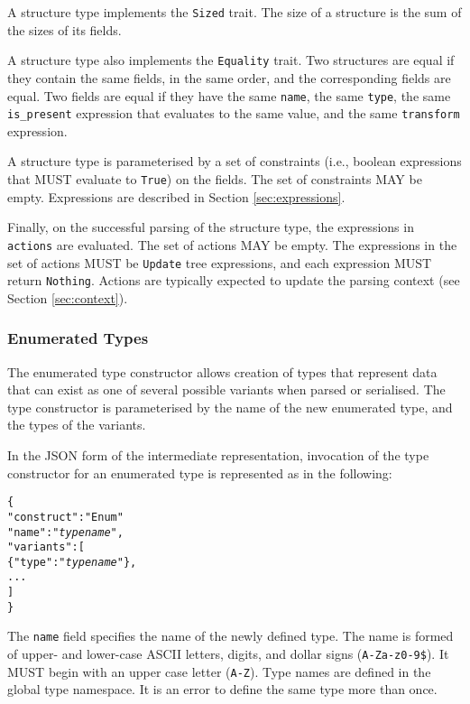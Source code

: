 \documentclass[10pt,twocolumn,a4paper]{article}
\newcommand{\code}[1]{\texttt{#1}}
\begin{document}
A structure type implements the \code{Sized} trait. The size of a structure is the
sum of the sizes of its fields.

A structure type also implements the \code{Equality} trait. Two structures
are equal if they contain the same fields, in the same order, and the
corresponding fields are equal. Two fields are equal if they have the same
\code{name}, the same \code{type}, the same \code{is\_present} expression
that evaluates to the same value, and the same \code{transform} expression.

A structure type is parameterised by a set of constraints (i.e., boolean
expressions that MUST evaluate to \code{True}) on the
fields. The set of constraints MAY be empty. Expressions are described in
Section \ref{sec:expressions}.

Finally, on the successful parsing of the structure type, the expressions
in \code{actions} are evaluated. The set of actions MAY be empty. The
expressions in the set of actions MUST be \code{Update} tree expressions,
and each expression MUST return \code{Nothing}. Actions are typically
expected to update the parsing context (see Section \ref{sec:context}).

\subsubsection{Enumerated Types}

The enumerated type constructor allows creation of types that represent
data that can exist as one of several possible variants when parsed or
serialised. The type constructor is parameterised by the name of the new
enumerated type, and the types of the variants.

In the JSON form of the intermediate representation, invocation of the type
constructor for an enumerated type is represented as in the following:
\footnotesize
\begin{alltt}
  \{
    "construct"   : "Enum"
    "name"        : "\emph{type name}",
    "variants"    : [
      \{"type" : "\emph{type name}"\},
      ...
    ]
  \}
\end{alltt}
\normalsize
The \code{name} field specifies the name of the newly defined type. The
name is formed of upper- and lower-case ASCII letters, digits, and dollar
signs (\code{A-Za-z0-9\$}).  It MUST begin with an upper case letter
(\code{A-Z}). Type names are defined in the global type namespace.
It is an error to define the same type more than once.
\end{document}
